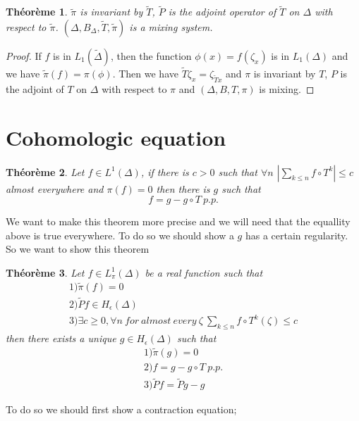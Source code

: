 \documentclass[12pt]{article}
\theoremstyle{plain}%
\newtheorem{thm}{Théorème}[section]
\theoremstyle{definition}
\theoremstyle{remark}
\begin{document}
\begin{thm} %
$\tilde{\pi}$ is invariant by $\tilde{T}$, $\tilde{P}$ is the adjoint operator of $\tilde{T}$ on $\Delta$ with respect to $\tilde{\pi}$. $(\Delta,B_\Delta,\tilde{T},\tilde{\pi})$ is a mixing system.
\end{thm}

\begin{proof}
If $f$ is in  $L_1(\tilde{\Delta})$, then the function $\phi(x)=f(\zeta_x)$ is in $L_1(\Delta)$ and we have $\tilde{\pi}(f) = \pi (\phi)$.
\newline
Then we have $\tilde{T} \zeta_x = \zeta_{\tilde{T}x}$ and $\pi$ is invariant by $T$, $P$ is the adjoint of $T$ on $\Delta$ with respect to $\pi$ and $(\Delta, B, T, \pi)$ is mixing.
\end{proof}

\section{Cohomologic equation}
\begin{thm}
Let $f \in L^1(\Delta)$, if there is $c>0$ such that $\forall n$ $|\sum_{k \leq n}f \circ T^k|\leq c$ almost everywhere and $\pi(f)=0$ then there is $g$ such that \[
f=g-g \circ T \ p.p.
\]
\end{thm}
We want to make this theorem more precise and we will need that the equallity above is true everywhere. To do so we should show a $g$ has a certain regularity. So we want to show this theorem
\begin{thm}
Let $f \in L^1_\pi(\Delta)$ be a real function such that \[
\begin{matrix}
1)\tilde{\pi}(f)=0 \\
2)\tilde{P}f \in H_\epsilon(\Delta)\\
3)\exists c \geq 0,\forall n \ for\ almost\ every\ \zeta \ \sum_{k \leq n}f \circ T^k(\zeta)\leq c
\end{matrix}
\]then there exists a unique $g \in H_\epsilon(\Delta)$ such that\[\begin{matrix}
1)\tilde{\pi}(g)=0 \\
2)f=g-g\circ T \ p.p. \\
3)\tilde{P}f=\tilde{P}g-g
\end{matrix}
\]
\end{thm}
To do so we should first show a contraction equation;
\end{document}
